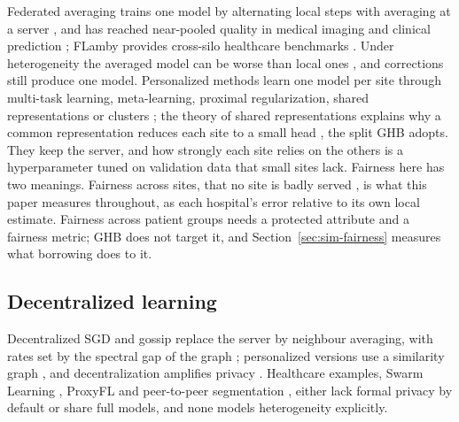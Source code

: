 \documentclass[acmsmall,screen,review]{acmart}
\theoremstyle{acmdefinition}
\begin{document}
Federated averaging trains one model by alternating local steps with averaging at a server \cite{mcmahan2017communication}, and has reached near-pooled quality in medical imaging and clinical prediction \cite{dayan2021federated,pati2022federated,rieke2020future,sheller2020federated}; FLamby provides cross-silo healthcare benchmarks \cite{ogierduterrail2022flamby}. Under heterogeneity the averaged model can be worse than local ones \cite{hsieh2020non,zhao2018federated}, and corrections \cite{karimireddy2020scaffold,li2020federated,li2021fedbn,mohri2019agnostic} still produce one model. Personalized methods learn one model per site through multi-task learning, meta-learning, proximal regularization, shared representations or clusters \cite{collins2021exploiting,deng2020adaptive,fallah2020personalized,ghosh2020efficient,li2021ditto,smith2017federated,tdinh2020personalized}; the theory of shared representations explains why a common representation reduces each site to a small head \cite{du2021few,maurer2016benefit,tripuraneni2020theory}, the split GHB adopts. They keep the server, and how strongly each site relies on the others is a hyperparameter tuned on validation data that small sites lack. Fairness here has two meanings. Fairness across sites, that no site is badly served \cite{li2021ditto,mohri2019agnostic}, is what this paper measures throughout, as each hospital's error relative to its own local estimate. Fairness across patient groups \cite{salazar2023fairfate} needs a protected attribute and a fairness metric; GHB does not target it, and Section~\ref{sec:sim-fairness} measures what borrowing does to it.

\subsection{Decentralized learning}\label{sec:decentralized}

Decentralized SGD and gossip replace the server by neighbour averaging, with rates set by the spectral gap of the graph \cite{boyd2006randomized,koloskova2020unified,lian2017can,nedic2009distributed,xiao2004fast}; personalized versions use a similarity graph \cite{bellet2018personalized,vanhaesebrouck2017decentralized}, and decentralization amplifies privacy \cite{cyffers2022privacy}. Healthcare examples, Swarm Learning \cite{warnatherresthal2021swarm}, ProxyFL \cite{kalra2023decentralized} and peer-to-peer segmentation \cite{roy2019braintorrent,tedeschini2022decentralized}, either lack formal privacy by default or share full models, and none models heterogeneity explicitly.
\end{document}
